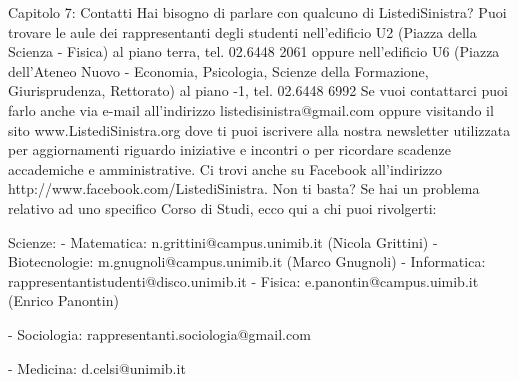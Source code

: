 Capitolo 7: Contatti
Hai bisogno di parlare con qualcuno di ListediSinistra? Puoi trovare le aule dei rappresentanti degli studenti  nell'edificio U2 (Piazza della Scienza - Fisica) al piano terra, tel. 02.6448 2061 oppure nell'edificio U6 (Piazza dell'Ateneo Nuovo - Economia, Psicologia, Scienze della Formazione, Giurisprudenza, Rettorato) al piano -1, tel. 02.6448 6992
Se vuoi contattarci puoi farlo anche via e-mail all’indirizzo listedisinistra@gmail.com oppure visitando il sito www.ListediSinistra.org dove ti puoi iscrivere alla nostra newsletter utilizzata per aggiornamenti riguardo iniziative e incontri o per ricordare scadenze accademiche e amministrative. Ci trovi anche su Facebook all'indirizzo http://www.facebook.com/ListediSinistra.
Non ti basta? Se hai un problema relativo ad uno specifico Corso di Studi, ecco qui a chi puoi rivolgerti:

Scienze:
   - Matematica: n.grittini@campus.unimib.it (Nicola Grittini)
   - Biotecnologie: m.gnugnoli@campus.unimib.it (Marco Gnugnoli)
   - Informatica: rappresentantistudenti@disco.unimib.it
   - Fisica: e.panontin@campus.uimib.it (Enrico Panontin)
   
   - Sociologia: rappresentanti.sociologia@gmail.com
   
   - Medicina: d.celsi@unimib.it
   
